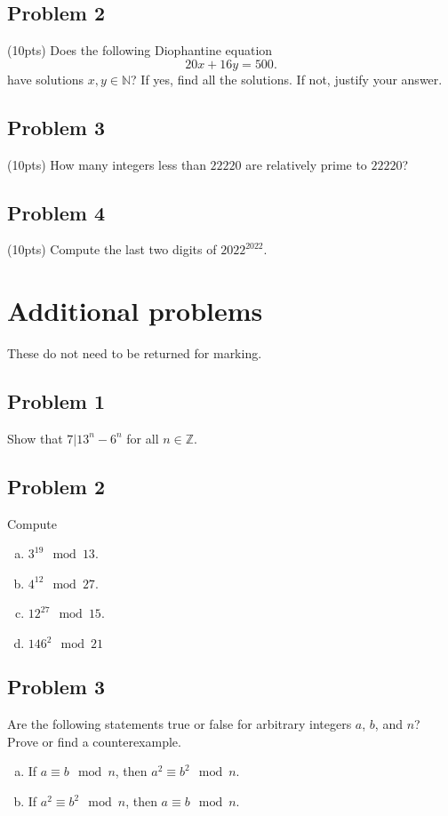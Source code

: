\documentclass{amsart}
\newcommand{\Z}{\mathbb{Z}}
\newcommand{\N}{\mathbb{N}}
\theoremstyle{definition} \newtheorem*{definition}{Definition}
\theoremstyle{remark} \newtheorem*{ex}{Example}
\begin{document}
\subsection*{Problem 2}
(10pts) Does the following Diophantine equation 
$$20x+16y=500.$$
have solutions $x,y \in \N$? If yes, find all the solutions. If not, justify your answer.

\subsection*{Problem 3}
(10pts) How many integers less than $22220$ are relatively prime to $22220$?

\subsection*{Problem 4}
(10pts) Compute the last two digits of $2022^{2022}$.







\section*{Additional problems}

These do not need to be returned for marking.

\subsection*{Problem 1}
Show that $7|13^n-6^n$ for all $n\in\Z$.


\subsection*{Problem 2}
Compute 
\begin{enumerate}[a)]\item$3^{19}\mod 13$.
\item $4^{12}\mod 27$.
\item $12^{27}\mod 15$.
\item $146^2\mod 21$
\end{enumerate}

\subsection*{Problem 3}
Are the following statements true or false for arbitrary integers $a$, $b$, and $n$? Prove or find a counterexample.
\begin{enumerate}[a)]
\item If $a\equiv b\mod n$, then $a^2\equiv b^2\mod n$.
\item If $a^2\equiv b^2\mod n$, then $a\equiv b\mod n$.
\end{enumerate}
\end{document}
